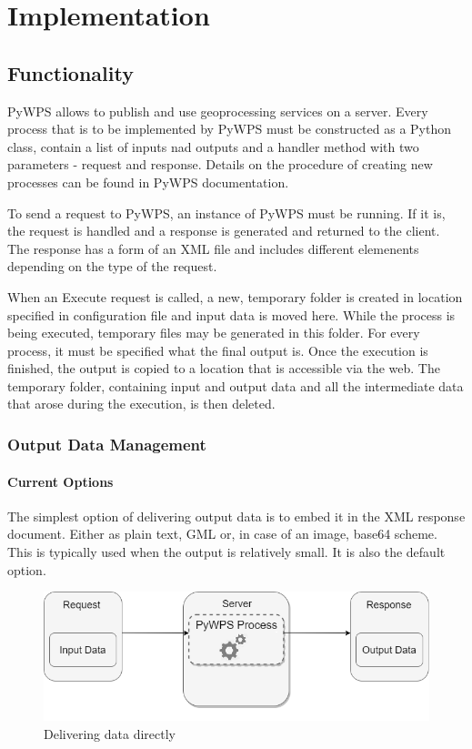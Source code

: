 \chapter{Implementation}
\label{4-practical}

\section{Functionality} 

PyWPS allows to publish and use geoprocessing services on a server. Every process that is to be implemented by PyWPS must be constructed as a Python class, contain a list of inputs nad outputs and a handler method with two parameters - request and response. \cite{pywpsprocess} Details on the procedure of creating new processes can be found in PyWPS documentation.

To send a request to PyWPS, an instance of PyWPS must be running. If it is, the request is handled and a response is generated and returned to the client. The response has a form of an XML file and includes different elemenents depending on the type of the request.

When an Execute request is called, a new, temporary folder is created in location specified in configuration file and input data is moved here. While the process is being executed, temporary files may be generated in this folder. For every process, it must be specified what the final output is. Once the execution is finished, the output is copied to a location that is accessible via the web. The temporary folder, containing input and output data and all the intermediate data that arose during the execution, is then deleted.

\subsection{Output Data Management}

\subsubsection{Current Options} 

The simplest option of delivering output data is to embed it in the XML response document. Either as plain text, GML or, in case of an image, base64 scheme. This is typically used when the output is relatively small. It is also the default option.

\begin{figure}[H] \centering
      \includegraphics[width=350pt]{./pictures/optionone.png}
      \caption[Delivering data directly]{Delivering data directly}
      \label{fig:optionone}
  \end{figure}

